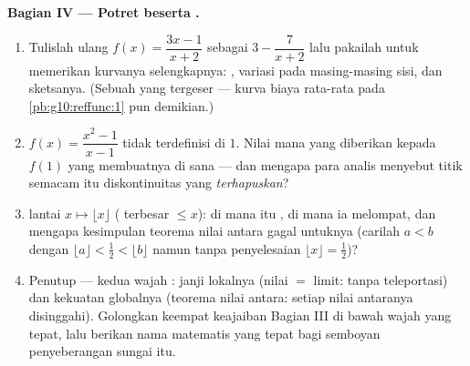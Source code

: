 \begin{problem}
\medskip
\noindent\textbf{Bagian IV --- Potret beserta .}
\begin{enumerate}[resume]
  \item Tulislah ulang $f(x) = \dfrac{3x - 1}{x + 2}$ sebagai
        $3 - \dfrac{7}{x + 2}$ lalu pakailah untuk memerikan kurvanya
        selengkapnya: , variasi pada masing-masing sisi, dan
        sketsanya. (Sebuah  yang tergeser --- kurva biaya rata-rata
        pada \cref{pb:g10:reffunc:1} pun demikian.)
  \item {} $f(x) = \dfrac{x^2 - 1}{x - 1}$ tidak
        terdefinisi di $1$. Nilai mana yang diberikan kepada $f(1)$ yang
        membuatnya  di sana --- dan mengapa para analis menyebut titik
        semacam itu diskontinuitas yang \emph{terhapuskan}?
  \item {} lantai $x \mapsto \lfloor x \rfloor$
        ( terbesar $\leq x$): di mana  itu ,
        di mana ia melompat, dan mengapa kesimpulan teorema nilai antara
        gagal untuknya (carilah $a < b$ dengan
        $\lfloor a \rfloor < \frac12 < \lfloor b \rfloor$ namun
        tanpa penyelesaian $\lfloor x \rfloor = \frac12$)?
  \item Penutup --- kedua wajah : janji lokalnya
        (nilai $=$ limit: tanpa teleportasi) dan kekuatan globalnya
        (teorema nilai antara: setiap nilai antaranya disinggahi). Golongkan
        keempat keajaiban Bagian III di bawah wajah yang tepat, lalu berikan
        nama matematis yang tepat bagi semboyan penyeberangan sungai itu.

\end{enumerate}
\end{problem}
